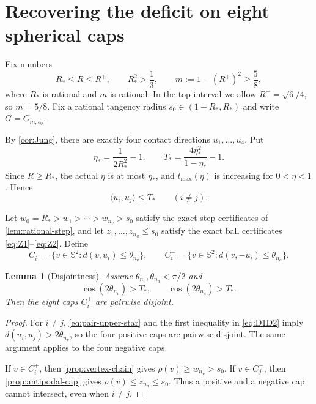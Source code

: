 \documentclass[11pt,reqno]{amsart}
\numberwithin{equation}{section}
\newtheorem{lemma}[theorem]{Lemma}
\theoremstyle{definition}
\theoremstyle{remark}
\newcommand{\Sph}{\mathbb{S}^{2}}
\newcommand{\ip}[2]{\langle #1,#2\rangle}
\begin{document}
\section{Recovering the deficit on eight spherical caps}\label{sec:caps}

Fix numbers
\begin{equation}\label{eq:R-interval}
 R_{*}\leq R\leq R^{+},
 \qquad
 R_{*}^{2}>\frac13,
 \qquad
 m:=1-(R^{+})^{2}\geq\frac58,
\end{equation}
where $R_{*}$ is rational and $m$ is rational. In the top interval we allow $R^{+}=\sqrt6/4$, so $m=5/8$. Fix a rational tangency radius $s_0\in(1-R_{*},R_{*})$ and write $G=G_{m,s_0}$.

By \cref{cor:Jung}, there are exactly four contact directions $u_1,\dots,u_4$. Put
\begin{equation}\label{eq:eta-star}
 \eta_{*}=\frac{1}{2R_{*}^{2}}-1,
 \qquad
 T_{*}=\frac{4\eta_{*}^{2}}{1-\eta_{*}}-1.
\end{equation}
Since $R\geq R_{*}$, the actual $\eta$ is at most $\eta_{*}$, and $t_{\max}(\eta)$ is increasing for $0<\eta<1$. Hence
\begin{equation}\label{eq:pair-upper-star}
 \ip{u_i}{u_j}\leq T_{*}\qquad(i\neq j).
\end{equation}

Let $w_0=R_{*}>w_1>\cdots>w_{n_v}>s_0$ satisfy the exact step certificates of \cref{lem:rational-step}, and let $z_1,\dots,z_{n_a}\leq s_0$ satisfy the exact ball certificates \eqref{eq:Z1}--\eqref{eq:Z2}. Define
\[
 C_i^{+}=\{v\in\Sph:d(v,u_i)\leq\theta_{n_v}\},
 \qquad
 C_i^{-}=\{v\in\Sph:d(v,-u_i)\leq\theta_{n_a}\}.
\]

\begin{lemma}[Disjointness]\label{lem:cap-disjointness}
Assume $\theta_{n_v},\theta_{n_a}<\pi/2$ and
\begin{equation}\label{eq:D1D2}
 \cos(2\theta_{n_v})>T_{*},
 \qquad
 \cos(2\theta_{n_a})>T_{*}.
\end{equation}
Then the eight caps $C_i^{\pm}$ are pairwise disjoint.
\end{lemma}

\begin{proof}
For $i\neq j$, \eqref{eq:pair-upper-star} and the first inequality in \eqref{eq:D1D2} imply
$d(u_i,u_j)>2\theta_{n_v}$, so the four positive caps are pairwise disjoint. The same argument applies to the four negative caps.

If $v\in C_i^{+}$, then \cref{prop:vertex-chain} gives
$\rho(v)\geq w_{n_v}>s_0$. If $v\in C_j^{-}$, then \cref{prop:antipodal-cap} gives
$\rho(v)\leq z_{n_a}\leq s_0$. Thus a positive and a negative cap cannot intersect, even when $i\neq j$.
\end{proof}
\end{document}
